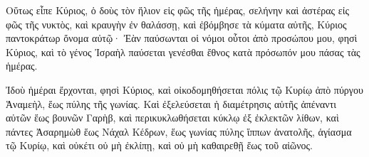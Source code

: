 {\par }{\PP {}Οὕτως εἶπε Κύριος, ὁ δοὺς τὸν ἥλιον εἱς φῶς τῆς ἡμέρας, σελήνην καὶ ἀστέρας εἰς φῶς τῆς νυκτὸς, καὶ κραυγὴν ἐν θαλάσσῃ, καὶ ἐβόμβησε τὰ κύματα αὐτῆς, Κύριος παντοκράτωρ ὄνομα αὐτῷ·
Ἐὰν παύσωνται οἱ νόμοι οὗτοι ἀπὸ προσώπου μου, φησὶ Κύριος, καὶ τὸ γένος Ἰσραὴλ παύσεται γενέσθαι ἔθνος κατὰ πρόσωπόν μου πάσας τὰς ἡμέρας.
\par }{\PP {}Ἰδοὺ ἡμέραι ἔρχονται, φησὶ Κύριος, καὶ οἰκοδομηθήσεται πόλις τῷ Κυρίῳ ἀπὸ πύργου Ἁναμεὴλ, ἕως πύλης τῆς γωνίας.
Καὶ ἐξελεύσεται ἡ διαμέτρησις αὐτῆς ἀπέναντι αὐτῶν ἕως βουνῶν Γαρὴβ, καὶ περικυκλωθήσεται κύκλῳ ἐξ ἐκλεκτῶν λίθων,
καὶ πάντες Ἀσαρημὼθ ἕως Νάχαλ Κέδρων, ἕως γωνίας πύλης ἵππων ἀνατολῆς, ἁγίασμα τῷ Κυρίῳ, καὶ οὐκέτι οὐ μὴ ἐκλίπῃ, καὶ οὐ μὴ καθαιρεθῇ ἕως τοῦ αἰῶνος.

}
